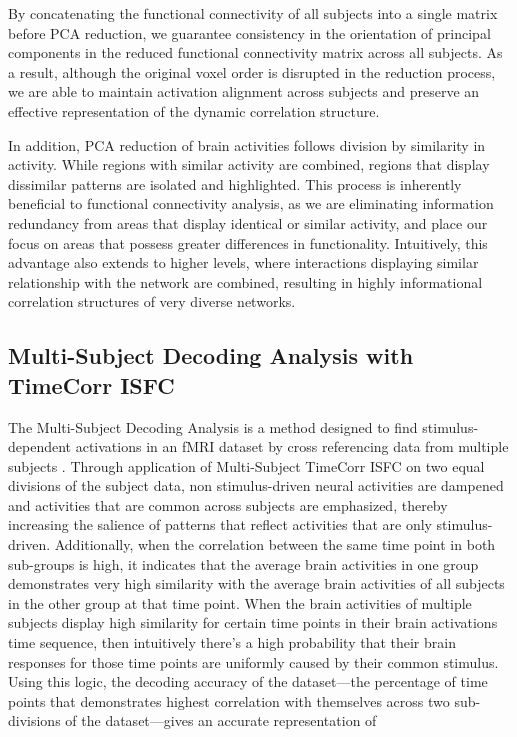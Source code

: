 \documentclass[11pt]{article}
\begin{document}
By concatenating the functional connectivity of all subjects into a single matrix before PCA reduction, we guarantee consistency in the orientation of principal components in the reduced functional connectivity matrix across all subjects. As a result, although the original voxel order is disrupted in the reduction process, we are able to maintain activation alignment across subjects and preserve an effective representation of the dynamic correlation structure.

In addition, PCA reduction of brain activities follows division by similarity in activity. While regions with similar activity are combined, regions that display dissimilar patterns are isolated and highlighted. This process is inherently beneficial to functional connectivity analysis, as we are eliminating information redundancy from areas that display identical or similar activity, and place our focus on areas that possess greater differences in functionality. Intuitively, this advantage also extends to higher levels, where interactions displaying similar relationship with the network are combined, resulting in highly informational correlation structures of very diverse networks.

\subsection{Multi-Subject Decoding Analysis with TimeCorr ISFC}
The Multi-Subject Decoding Analysis is a method designed to find stimulus-dependent activations in an fMRI dataset by cross referencing data from multiple subjects \citep{jeremy2017}. Through application of Multi-Subject TimeCorr ISFC on two equal divisions of the subject data, non stimulus-driven neural activities are dampened and activities that are common across subjects are emphasized, thereby increasing the salience of patterns that reflect activities that are only stimulus-driven. Additionally, when the correlation between the same time point in both sub-groups is high, it indicates that the average brain activities in one group demonstrates very high similarity with the average brain activities of all subjects in the other group at that time point. When the brain activities of multiple subjects display high similarity for certain time points in their brain activations time sequence, then intuitively there's a high probability that their brain responses for those time points are uniformly caused by their common stimulus. Using this logic, the decoding accuracy of the dataset---the percentage of time points that demonstrates highest correlation with themselves across two sub-divisions of the dataset---gives an accurate representation of
\end{document}
